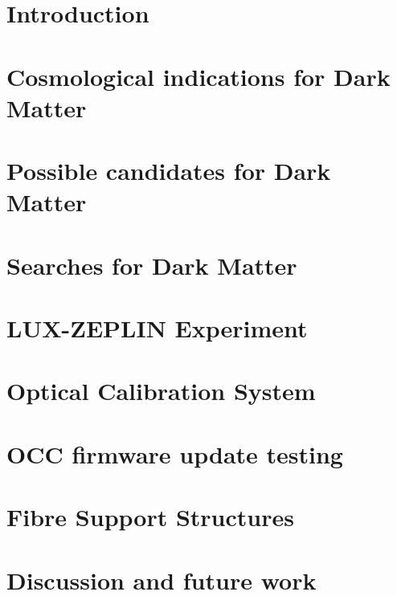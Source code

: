 \documentclass{report}
\begin{document}
\chapter{Introduction}\label{Chap1:Intro}
\setcounter{page}{1}


\chapter{Cosmological indications for Dark Matter}\label{Chap2:Cosmo}


\chapter{Possible candidates for Dark Matter}\label{Chap3:Candi}


\chapter{Searches for Dark Matter}\label{Chap4:Search}


\chapter{LUX-ZEPLIN Experiment}\label{Chap5:LZ}


\chapter{Optical Calibration System}\label{Chap6:OCS}


\chapter{OCC firmware update testing}\label{Chap7:FST}


\chapter{Fibre Support Structures}\label{Chap8:FSS}


\chapter{Discussion and future work}\label{Chap10:Discussion}


\printbibliography
\end{document}

